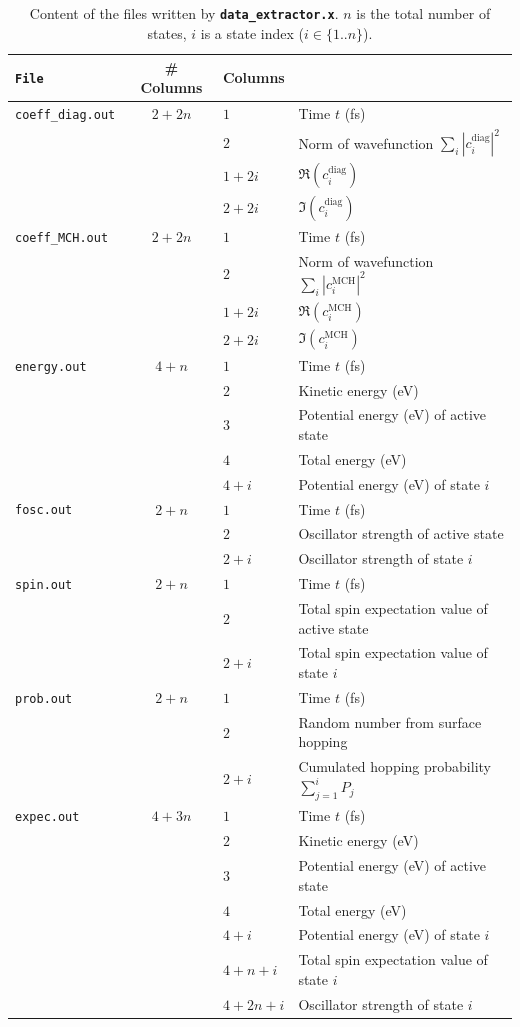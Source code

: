 \documentclass[a4paper,11pt,DIV=15,openany,twoside=false]{scrbook}
\newcommand{\ttt}[1]{\textbf{\texttt{#1}}}
\begin{document}
\begin{table}
  \centering
  \caption{Content of the files written by \ttt{data\_extractor.x}. $n$ is the total number of states, $i$ is a state index ($i\in\{1..n\}$).}
  \label{tab:outputdata}
  \begin{tabular}{>{\tt}lcll}
    \toprule
    File  &\# Columns     &\multicolumn{2}{l}{Columns}\\
    \midrule
    coeff\_diag.out       &$2+2n$
      &$1$ &Time $t$ (fs)\\
      &&$2$ &Norm of wavefunction $\sum_i |c_i^{\text{diag}}|^2$\\
      &&$1+2i$ &$\Re (c_i^{\text{diag}})$\\
      &&$2+2i$ &$\Im (c_i^{\text{diag}})$\\
    coeff\_MCH.out       &$2+2n$
      &$1$ &Time $t$ (fs)\\
      &&$2$ &Norm of wavefunction $\sum_i |c_i^{\text{MCH}}|^2$\\
      &&$1+2i$ &$\Re (c_i^{\text{MCH}})$\\
      &&$2+2i$ &$\Im (c_i^{\text{MCH}})$\\
    energy.out       &$4+n$
      &$1$ &Time $t$ (fs)\\
      &&$2$ &Kinetic energy (eV)\\
      &&$3$ &Potential energy (eV) of active state\\
      &&$4$ &Total energy (eV)\\
      &&$4+i$ &Potential energy (eV) of state $i$\\
    fosc.out       &$2+n$
      &$1$ &Time $t$ (fs)\\
      &&$2$ &Oscillator strength of active state\\
      &&$2+i$ &Oscillator strength of state $i$\\
    spin.out       &$2+n$
      &$1$ &Time $t$ (fs)\\
      &&$2$ &Total spin expectation value of active state\\
      &&$2+i$ &Total spin expectation value of state $i$\\
    prob.out       &$2+n$
      &$1$ &Time $t$ (fs)\\
      &&$2$ &Random number from surface hopping\\
      &&$2+i$ &Cumulated hopping probability $\sum_{j=1}^i P_j$\\
    expec.out      &$4+3n$
      &$1$ &Time $t$ (fs)\\
      &&$2$ &Kinetic energy (eV)\\
      &&$3$ &Potential energy (eV) of active state\\
      &&$4$ &Total energy (eV)\\
      &&$4+i$ &Potential energy (eV) of state $i$\\
      &&$4+n+i$ &Total spin expectation value of state $i$\\
      &&$4+2n+i$ &Oscillator strength of state $i$\\
    \bottomrule
  \end{tabular}
\end{table}
\end{document}
